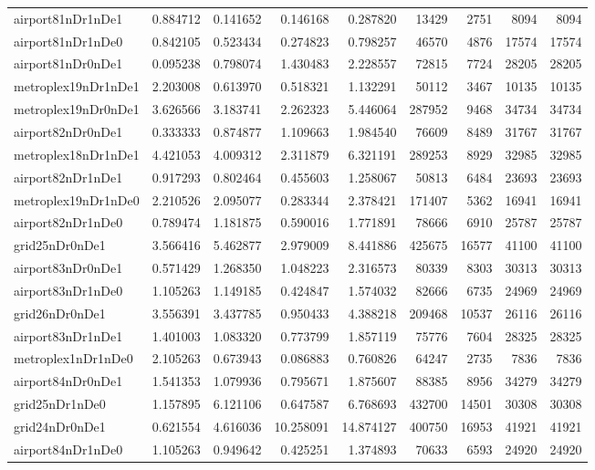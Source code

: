\begin{longtable}{|l|r|r|r|r|r|r|r|r|}
airport81nDr1nDe1 & 0.884712 & 0.141652 & 0.146168 & 0.287820 & 13429 & 2751 & 8094 & 8094 \\
airport81nDr1nDe0 & 0.842105 & 0.523434 & 0.274823 & 0.798257 & 46570 & 4876 & 17574 & 17574 \\
airport81nDr0nDe1 & 0.095238 & 0.798074 & 1.430483 & 2.228557 & 72815 & 7724 & 28205 & 28205 \\
metroplex19nDr1nDe1 & 2.203008 & 0.613970 & 0.518321 & 1.132291 & 50112 & 3467 & 10135 & 10135 \\
metroplex19nDr0nDe1 & 3.626566 & 3.183741 & 2.262323 & 5.446064 & 287952 & 9468 & 34734 & 34734 \\
airport82nDr0nDe1 & 0.333333 & 0.874877 & 1.109663 & 1.984540 & 76609 & 8489 & 31767 & 31767 \\
metroplex18nDr1nDe1 & 4.421053 & 4.009312 & 2.311879 & 6.321191 & 289253 & 8929 & 32985 & 32985 \\
airport82nDr1nDe1 & 0.917293 & 0.802464 & 0.455603 & 1.258067 & 50813 & 6484 & 23693 & 23693 \\
metroplex19nDr1nDe0 & 2.210526 & 2.095077 & 0.283344 & 2.378421 & 171407 & 5362 & 16941 & 16941 \\
airport82nDr1nDe0 & 0.789474 & 1.181875 & 0.590016 & 1.771891 & 78666 & 6910 & 25787 & 25787 \\
grid25nDr0nDe1 & 3.566416 & 5.462877 & 2.979009 & 8.441886 & 425675 & 16577 & 41100 & 41100 \\
airport83nDr0nDe1 & 0.571429 & 1.268350 & 1.048223 & 2.316573 & 80339 & 8303 & 30313 & 30313 \\
airport83nDr1nDe0 & 1.105263 & 1.149185 & 0.424847 & 1.574032 & 82666 & 6735 & 24969 & 24969 \\
grid26nDr0nDe1 & 3.556391 & 3.437785 & 0.950433 & 4.388218 & 209468 & 10537 & 26116 & 26116 \\
airport83nDr1nDe1 & 1.401003 & 1.083320 & 0.773799 & 1.857119 & 75776 & 7604 & 28325 & 28325 \\
metroplex1nDr1nDe0 & 2.105263 & 0.673943 & 0.086883 & 0.760826 & 64247 & 2735 & 7836 & 7836 \\
airport84nDr0nDe1 & 1.541353 & 1.079936 & 0.795671 & 1.875607 & 88385 & 8956 & 34279 & 34279 \\
grid25nDr1nDe0 & 1.157895 & 6.121106 & 0.647587 & 6.768693 & 432700 & 14501 & 30308 & 30308 \\
grid24nDr0nDe1 & 0.621554 & 4.616036 & 10.258091 & 14.874127 & 400750 & 16953 & 41921 & 41921 \\
airport84nDr1nDe0 & 1.105263 & 0.949642 & 0.425251 & 1.374893 & 70633 & 6593 & 24920 & 24920 \\

\end{longtable}
